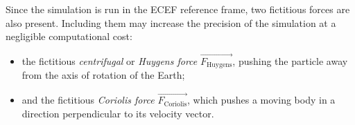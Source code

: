     Since the simulation is run in the ECEF reference frame, two fictitious forces are also present.
    Including them may increase the precision of the simulation at a negligible computational cost:
    \begin{itemize}
        \item the fictitious \emph{centrifugal} or \emph{Huygens force} $\vec{F_{\mathrm{Huygens}}}$,
            pushing the particle away from the axis of rotation of the Earth;
        \item and the fictitious \emph{Coriolis force} $\vec{F_{\mathrm{Coriolis}}}$,
            which pushes a moving body in a direction perpendicular to its velocity vector.
    \end{itemize}
%
%
%
%

